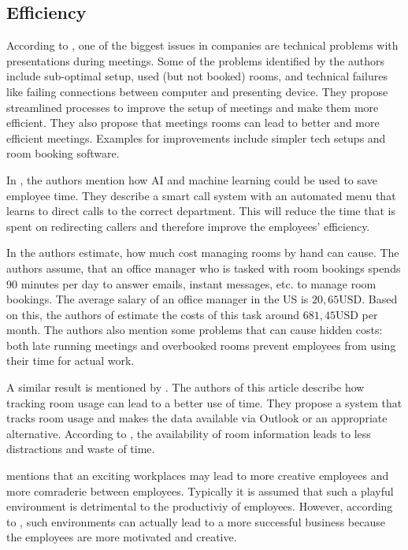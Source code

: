 \subsection{Efficiency}




According to \cite{roomzille3}, one of the biggest issues in companies are technical problems with presentations during meetings. Some of the problems identified by the authors include sub-optimal setup, used (but not booked) rooms, and technical failures like failing connections between computer and presenting device. They propose streamlined processes to improve the setup of meetings and make them more efficient. They also propose that meetings rooms can lead to better and more efficient meetings. Examples for improvements include simpler tech setups and room booking software.

In \cite{hbcommunications}, the authors mention how AI and machine learning could be used to save employee time. They describe a smart call system with an automated menu that learns to direct calls to the correct department. This will reduce the time that is spent on redirecting callers and therefore improve the employees' efficiency. 

In \cite{roomzilla9} the authors estimate, how much cost managing rooms by hand can cause. The authors assume, that an office manager who is tasked with room bookings spends 90 minutes per day to answer emails, instant messages, etc. to manage room bookings. The average salary of an office manager in the US is \(20,65\text{USD}\). Based on this, the authors of \cite{roomzilla9} estimate the costs of this task around \(681,45\text{USD}\) per month. The authors also mention some problems that can cause hidden costs: both late running meetings and overbooked rooms prevent employees from using their time for actual work. 

A similar result is mentioned by \cite{iotagenda}. The authors of this article describe how tracking room usage can lead to a better use of time. They propose a system that tracks room usage and makes the data available via Outlook or an appropriate alternative. According to \cite{iotagenda}, the availability of room information leads to less distractions and waste of time. 


\cite{roomzilla3} mentions that an exciting workplaces may lead to more creative employees and more comraderie between employees. Typically it is assumed that such a playful environment is detrimental to the productiviy of employees. However, according to \cite{metrooffice}, such environments can actually lead to a more successful business because the employees are more motivated and creative.

